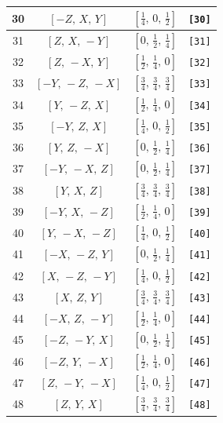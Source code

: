 \documentclass[fleqn,8pt]{jsarticle}
\begin{document}
\begin{longtable}{cccc}
30 & $\left[ - Z,\, X,\, Y \right]$ & $\left[ \frac{1}{4},\, 0,\, \frac{1}{2} \right]$ & {\tt [30]} \\ \hline
31 & $\left[ Z,\, X,\, - Y \right]$ & $\left[ 0,\, \frac{1}{2},\, \frac{1}{4} \right]$ & {\tt [31]} \\ \hline
32 & $\left[ Z,\, - X,\, Y \right]$ & $\left[ \frac{1}{2},\, \frac{1}{4},\, 0 \right]$ & {\tt [32]} \\ \hline
33 & $\left[ - Y,\, - Z,\, - X \right]$ & $\left[ \frac{3}{4},\, \frac{3}{4},\, \frac{3}{4} \right]$ & {\tt [33]} \\ \hline
34 & $\left[ Y,\, - Z,\, X \right]$ & $\left[ \frac{1}{2},\, \frac{1}{4},\, 0 \right]$ & {\tt [34]} \\ \hline
35 & $\left[ - Y,\, Z,\, X \right]$ & $\left[ \frac{1}{4},\, 0,\, \frac{1}{2} \right]$ & {\tt [35]} \\ \hline
36 & $\left[ Y,\, Z,\, - X \right]$ & $\left[ 0,\, \frac{1}{2},\, \frac{1}{4} \right]$ & {\tt [36]} \\ \hline
37 & $\left[ - Y,\, - X,\, Z \right]$ & $\left[ 0,\, \frac{1}{2},\, \frac{1}{4} \right]$ & {\tt [37]} \\ \hline
38 & $\left[ Y,\, X,\, Z \right]$ & $\left[ \frac{3}{4},\, \frac{3}{4},\, \frac{3}{4} \right]$ & {\tt [38]} \\ \hline
39 & $\left[ - Y,\, X,\, - Z \right]$ & $\left[ \frac{1}{2},\, \frac{1}{4},\, 0 \right]$ & {\tt [39]} \\ \hline
40 & $\left[ Y,\, - X,\, - Z \right]$ & $\left[ \frac{1}{4},\, 0,\, \frac{1}{2} \right]$ & {\tt [40]} \\ \hline
41 & $\left[ - X,\, - Z,\, Y \right]$ & $\left[ 0,\, \frac{1}{2},\, \frac{1}{4} \right]$ & {\tt [41]} \\ \hline
42 & $\left[ X,\, - Z,\, - Y \right]$ & $\left[ \frac{1}{4},\, 0,\, \frac{1}{2} \right]$ & {\tt [42]} \\ \hline
43 & $\left[ X,\, Z,\, Y \right]$ & $\left[ \frac{3}{4},\, \frac{3}{4},\, \frac{3}{4} \right]$ & {\tt [43]} \\ \hline
44 & $\left[ - X,\, Z,\, - Y \right]$ & $\left[ \frac{1}{2},\, \frac{1}{4},\, 0 \right]$ & {\tt [44]} \\ \hline
45 & $\left[ - Z,\, - Y,\, X \right]$ & $\left[ 0,\, \frac{1}{2},\, \frac{1}{4} \right]$ & {\tt [45]} \\ \hline
46 & $\left[ - Z,\, Y,\, - X \right]$ & $\left[ \frac{1}{2},\, \frac{1}{4},\, 0 \right]$ & {\tt [46]} \\ \hline
47 & $\left[ Z,\, - Y,\, - X \right]$ & $\left[ \frac{1}{4},\, 0,\, \frac{1}{2} \right]$ & {\tt [47]} \\ \hline
48 & $\left[ Z,\, Y,\, X \right]$ & $\left[ \frac{3}{4},\, \frac{3}{4},\, \frac{3}{4} \right]$ & {\tt [48]} \\
\end{longtable}
\end{document}
